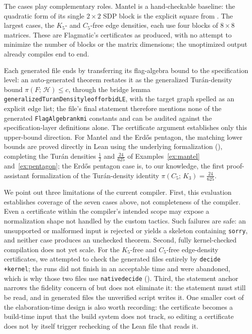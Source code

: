 \documentclass[acmsmall,screen=true,acmthm=false]{acmart}
\newcommand{\tdensity}[2]{\pi(#1;\,#2)}
\newcommand{\boldparagraph}[1]{\noindentparagraph{\textnormal{\textbf{#1}}}}
\DeclareRobustCommand{\lean}[1]{{\def\_{\textunderscore\allowbreak}\texttt{#1}}}
\begin{document}
The cases play complementary roles.  Mantel is a hand-checkable baseline: the
quadratic form of its single $2\times2$ SDP block is the explicit square from
.  The largest cases, the $K_5$- and $C_5$-free
edge densities, each use four blocks of $8\times8$
matrices.  These are Flagmatic's certificates as
produced, with no attempt to minimize the number of blocks or the matrix
dimensions; the unoptimized output already compiles end to end.

Each generated file ends by transferring its flag-algebra bound to the
specification level: an auto-generated theorem restates it as the generalized
Tur\'an-density bound $\tdensity{F}{\mathcal H}\le c$, through the bridge
lemma \lean{generalizedTuranDensity\_le\_of\_forbidLE}, with the target graph
spelled as an explicit edge list; the file's final statement therefore
mentions none of the generated \lean{FlagAlgebra\_n\_k\_m\_i} constants and can
be audited against the specification-layer definitions alone.  The certificate argument establishes only this
upper-bound direction.  For Mantel and the Erd\H{o}s pentagon,
the matching lower bounds are proved directly in Lean using the underlying
formalization (), completing the
Tur\'an densities $\tfrac12$ and $\tfrac{24}{625}$ of Examples~\ref{ex:mantel}
and~\ref{ex:pentagon}; the Erd\H{o}s pentagon case is, to our knowledge, the
first proof-assistant formalization of the Tur\'an-density identity
$\tdensity{C_5}{K_3}=\tfrac{24}{625}$.

\boldparagraph{Limitations.}
\label{sec:flagmatic-open}
We point out three limitations of the current compiler.
First, this evaluation establishes coverage of the seven cases above, not
completeness of the compiler.  Even a certificate within the compiler's
intended scope may expose a normalization shape not handled by the custom
tactics.  Such failures are safe: an unsupported or malformed input is
rejected or yields a skeleton containing \lean{sorry}, and neither case
produces an unchecked theorem.
Second, fully kernel-checked compilation does not yet scale.  For the
$K_5$-free and $C_5$-free edge-density certificates, we attempted to check the
generated files entirely by \lean{decide +kernel}; the runs did not finish in
an acceptable time and were abandoned, which is why those two files use
\lean{native\_decide} ().
Third, the statement anchor narrows the fidelity concern of
 but does not eliminate it: the statement must still
be read, and in generated files the unverified script writes
it.  One smaller cost of the elaboration-time design is
also worth recording: the certificate becomes a build-time input that the
build system does not track, so editing a certificate does not by itself
trigger rechecking of the Lean file that reads it.
\end{document}
